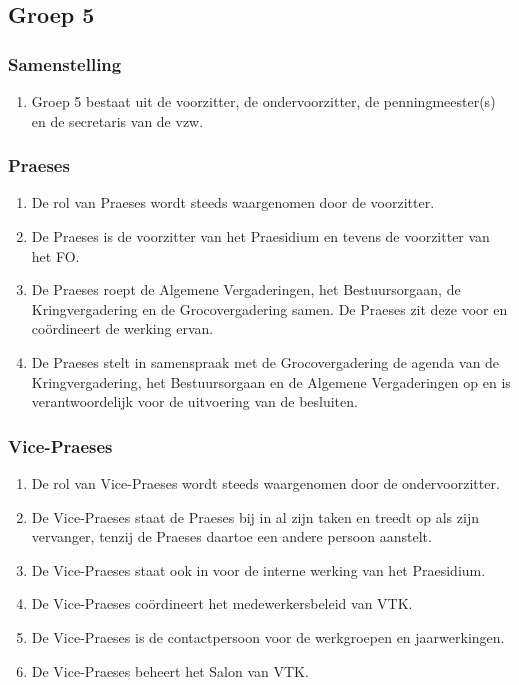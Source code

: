 \subsection{Groep 5}

    \subsubsection{Samenstelling}
    \begin{enumerate}
    \item Groep 5 bestaat uit de voorzitter, de ondervoorzitter, de penningmeester(s) en de secretaris van de vzw.
    \end{enumerate}
    
    \subsubsection{Praeses}
    \begin{enumerate}
    \item De rol van Praeses wordt steeds waargenomen door de voorzitter.
    \item De Praeses is de voorzitter van het Praesidium en tevens de voorzitter van het FO.
    \item De Praeses roept de Algemene Vergaderingen, het Bestuursorgaan, de Kringvergadering en de Grocovergadering samen. De Praeses zit deze voor en co\"ordineert de werking ervan.
    \item De Praeses stelt in samenspraak met de Grocovergadering de agenda van de Kringvergadering, het Bestuursorgaan en de Algemene Vergaderingen op en is verantwoordelijk voor de uitvoering van de besluiten.
    \end{enumerate}
    
    \subsubsection{Vice-Praeses}
    \begin{enumerate}
    \item De rol van Vice-Praeses wordt steeds waargenomen door de ondervoorzitter.
    \item De Vice-Praeses staat de Praeses bij in al zijn taken en treedt op als zijn vervanger, tenzij de Praeses daartoe een andere persoon aanstelt.
    \item De Vice-Praeses staat ook in voor de interne werking van het Praesidium.
    \item De Vice-Praeses co\"ordineert het medewerkersbeleid van VTK.
    \item De Vice-Praeses is de contactpersoon voor de werkgroepen en jaarwerkingen.
    \item De Vice-Praeses beheert het Salon van VTK. 
    \end{enumerate}
    
